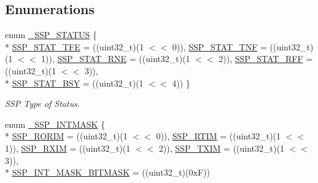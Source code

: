 \subsection*{Enumerations}
\begin{DoxyCompactItemize}
\item 
enum \hyperlink{group__SSP__17XX__40XX_ga4ec33a0121a2ccab848c7b37907d9e9d}{\-\_\-\-S\-S\-P\-\_\-\-S\-T\-A\-T\-U\-S} \{ \\*
\hyperlink{group__SSP__17XX__40XX_gga4ec33a0121a2ccab848c7b37907d9e9daf2476dad0360373ccb5896f6f4283569}{S\-S\-P\-\_\-\-S\-T\-A\-T\-\_\-\-T\-F\-E} = ((uint32\-\_\-t)(1 $<$$<$ 0)), 
\hyperlink{group__SSP__17XX__40XX_gga4ec33a0121a2ccab848c7b37907d9e9da895067b502eeae3c476190e309abde1a}{S\-S\-P\-\_\-\-S\-T\-A\-T\-\_\-\-T\-N\-F} = ((uint32\-\_\-t)(1 $<$$<$ 1)), 
\hyperlink{group__SSP__17XX__40XX_gga4ec33a0121a2ccab848c7b37907d9e9da82f15e0720cc2b0dc53e90b7546fb96b}{S\-S\-P\-\_\-\-S\-T\-A\-T\-\_\-\-R\-N\-E} = ((uint32\-\_\-t)(1 $<$$<$ 2)), 
\hyperlink{group__SSP__17XX__40XX_gga4ec33a0121a2ccab848c7b37907d9e9dad10671a086364beb55efad01f2c3688f}{S\-S\-P\-\_\-\-S\-T\-A\-T\-\_\-\-R\-F\-F} = ((uint32\-\_\-t)(1 $<$$<$ 3)), 
\\*
\hyperlink{group__SSP__17XX__40XX_gga4ec33a0121a2ccab848c7b37907d9e9da5129659a9c16fdda33b925f07cf8ef52}{S\-S\-P\-\_\-\-S\-T\-A\-T\-\_\-\-B\-S\-Y} = ((uint32\-\_\-t)(1 $<$$<$ 4))
 \}
\begin{DoxyCompactList}\small\item\em S\-S\-P Type of Status. \end{DoxyCompactList}\item 
enum \hyperlink{group__SSP__17XX__40XX_gab6a0ac593093184dd21c95f53b30f4ef}{\-\_\-\-S\-S\-P\-\_\-\-I\-N\-T\-M\-A\-S\-K} \{ \\*
\hyperlink{group__SSP__17XX__40XX_ggab6a0ac593093184dd21c95f53b30f4efa891bf6d7622b4f6f010396f08a51adbf}{S\-S\-P\-\_\-\-R\-O\-R\-I\-M} = ((uint32\-\_\-t)(1 $<$$<$ 0)), 
\hyperlink{group__SSP__17XX__40XX_ggab6a0ac593093184dd21c95f53b30f4efaabb6398ce8ef5db95fc47fc2bd525f13}{S\-S\-P\-\_\-\-R\-T\-I\-M} = ((uint32\-\_\-t)(1 $<$$<$ 1)), 
\hyperlink{group__SSP__17XX__40XX_ggab6a0ac593093184dd21c95f53b30f4efa2fff5a42799aae53c7a4bf3e3a900448}{S\-S\-P\-\_\-\-R\-X\-I\-M} = ((uint32\-\_\-t)(1 $<$$<$ 2)), 
\hyperlink{group__SSP__17XX__40XX_ggab6a0ac593093184dd21c95f53b30f4efa34e61a5c1d77d3763e4f8e1bfacbdcc4}{S\-S\-P\-\_\-\-T\-X\-I\-M} = ((uint32\-\_\-t)(1 $<$$<$ 3)), 
\\*
\hyperlink{group__SSP__17XX__40XX_ggab6a0ac593093184dd21c95f53b30f4efa46081a07592bbc197435bbb21cc1e201}{S\-S\-P\-\_\-\-I\-N\-T\-\_\-\-M\-A\-S\-K\-\_\-\-B\-I\-T\-M\-A\-S\-K} = ((uint32\-\_\-t)(0x\-F))
$$
\end{DoxyCompactItemize}
